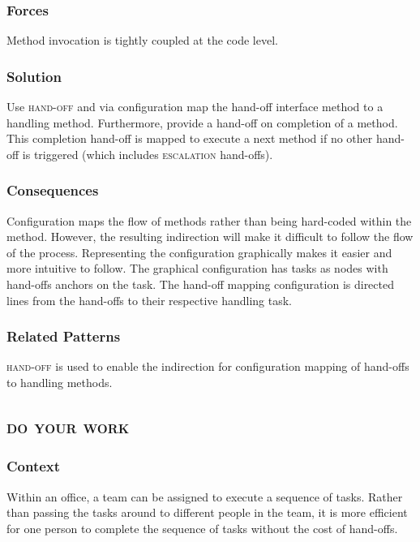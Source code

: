 \documentclass[prodmode]{style/acmlarge}
\begin{document}
\subsubsection*{Forces} Method invocation is tightly coupled at the code level.

\subsubsection*{\textbf{Solution}} Use \textsc{hand-off} and via configuration map the
hand-off interface method to a handling method.  Furthermore, provide a hand-off
on completion of a method.  This completion hand-off is mapped to execute a next
method if no other hand-off is triggered (which includes \textsc{escalation}
hand-offs).

\subsubsection*{Consequences} Configuration maps the flow of methods rather than
being hard-coded within the method.  However, the resulting indirection will
make it difficult to follow the flow of the process.  Representing the
configuration graphically makes it easier and more intuitive to follow.  The
graphical configuration has tasks as nodes with hand-offs anchors on the task. 
The hand-off mapping configuration is directed lines from the hand-offs to their
respective handling task.

\subsubsection*{Related Patterns} \textsc{hand-off} is used to enable the
indirection for configuration mapping of hand-offs to handling methods.




\subsection{\textsc{\textbf{do your work}}}

\subsubsection*{Context} Within an office, a team can be assigned to execute a
sequence of tasks.  Rather than passing the tasks around to different people in
the team, it is more efficient for one person to complete the sequence of tasks
without the cost of hand-offs.
\end{document}
